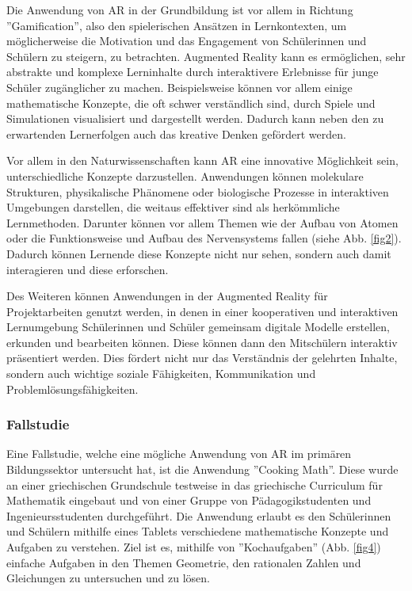 \documentclass[conference]{IEEEtran}
\begin{document}
Die Anwendung von AR in der Grundbildung ist vor allem in Richtung ''Gamification'', 
also den spielerischen Ansätzen in Lernkontexten, um möglicherweise die Motivation und das Engagement von Schülerinnen
und Schülern zu steigern, zu betrachten. \cite{b13} Augmented Reality kann es ermöglichen, sehr abstrakte und komplexe Lerninhalte durch interaktivere Erlebnisse für junge Schüler zugänglicher zu machen. Beispielsweise können vor allem einige mathematische Konzepte,
die oft schwer verständlich sind, durch Spiele und Simulationen visualisiert und dargestellt werden. Dadurch kann
neben den zu erwartenden Lernerfolgen auch das kreative Denken gefördert werden. \cite{b4}

Vor allem in den Naturwissenschaften kann AR eine innovative Möglichkeit sein, unterschiedliche Konzepte darzustellen.
Anwendungen können molekulare Strukturen, physikalische Phänomene oder biologische Prozesse in interaktiven Umgebungen darstellen, die weitaus effektiver sind als herkömmliche Lernmethoden. 
Darunter können vor allem Themen wie der Aufbau von Atomen oder die Funktionsweise und Aufbau des Nervensystems fallen (siehe Abb. \ref{fig2}). Dadurch können Lernende diese Konzepte nicht nur sehen,
sondern auch damit interagieren und diese erforschen. \cite{b6}

Des Weiteren können Anwendungen in der Augmented Reality für Projektarbeiten genutzt werden, in denen in einer kooperativen und interaktiven Lernumgebung Schülerinnen und Schüler gemeinsam digitale Modelle erstellen, erkunden und bearbeiten können.
Diese können dann den Mitschülern interaktiv präsentiert werden. Dies fördert nicht nur das Verständnis der gelehrten Inhalte,
sondern auch wichtige soziale Fähigkeiten, Kommunikation und Problemlösungsfähigkeiten.

\subsubsection*{Fallstudie}
Eine Fallstudie, welche eine mögliche Anwendung von AR im primären Bildungssektor untersucht hat, ist die Anwendung ''Cooking Math''.
Diese wurde an einer griechischen Grundschule testweise in das griechische Curriculum für Mathematik eingebaut und von einer Gruppe von Pädagogikstudenten und Ingenieursstudenten durchgeführt.
Die Anwendung erlaubt es den Schülerinnen und Schülern mithilfe eines Tablets verschiedene mathematische Konzepte und Aufgaben zu verstehen. Ziel ist es, mithilfe von ''Kochaufgaben'' (Abb. \ref{fig4}) einfache Aufgaben in den Themen Geometrie, den rationalen Zahlen und Gleichungen zu untersuchen und zu lösen.
\end{document}
